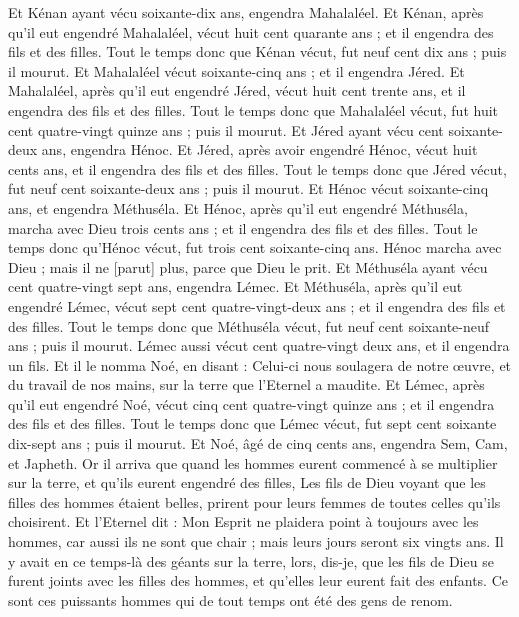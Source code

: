 \begin{multicols}{2}
Et Kénan ayant vécu soixante-dix ans, engendra Mahalaléel.
Et Kénan, après qu'il eut engendré Mahalaléel, vécut huit cent quarante ans ; et il engendra des fils et des filles.
Tout le temps donc que Kénan vécut, fut neuf cent dix ans ; puis il mourut.
Et Mahalaléel vécut soixante-cinq ans ; et il engendra Jéred.
Et Mahalaléel, après qu'il eut engendré Jéred, vécut huit cent trente ans, et il engendra des fils et des filles.
Tout le temps donc que Mahalaléel vécut, fut huit cent quatre-vingt quinze ans ; puis il mourut.
Et Jéred ayant vécu cent soixante-deux ans, engendra Hénoc.
Et Jéred, après avoir engendré Hénoc, vécut huit cents ans, et il engendra des fils et des filles.
Tout le temps donc que Jéred vécut, fut neuf cent soixante-deux ans ; puis il mourut.
Et Hénoc vécut soixante-cinq ans, et engendra Méthuséla.
Et Hénoc, après qu'il eut engendré Méthuséla, marcha avec Dieu trois cents ans ; et il engendra des fils et des filles.
Tout le temps donc qu'Hénoc vécut, fut trois cent soixante-cinq ans.
Hénoc marcha avec Dieu ; mais il ne [parut] plus, parce que Dieu le prit.
Et Méthuséla ayant vécu cent quatre-vingt sept ans, engendra Lémec.
Et Méthuséla, après qu'il eut engendré Lémec, vécut sept cent quatre-vingt-deux ans ; et il engendra des fils et des filles.
Tout le temps donc que Méthuséla vécut, fut neuf cent soixante-neuf ans ; puis il mourut.
Lémec aussi vécut cent quatre-vingt deux ans, et il engendra un fils.
Et il le nomma Noé, en disant : Celui-ci nous soulagera de notre œuvre, et du travail de nos mains, sur la terre que l'Eternel a maudite.
Et Lémec, après qu'il eut engendré Noé, vécut cinq cent quatre-vingt quinze ans ; et il engendra des fils et des filles.
Tout le temps donc que Lémec vécut, fut sept cent soixante dix-sept ans ; puis il mourut.
Et Noé, âgé de cinq cents ans, engendra Sem, Cam, et Japheth.
\VerseOne{}Or il arriva que quand les hommes eurent commencé à se multiplier sur la terre, et qu'ils eurent engendré des filles,
Les fils de Dieu voyant que les filles des hommes étaient belles, prirent pour leurs femmes de toutes celles qu'ils choisirent.
Et l'Eternel dit : Mon Esprit ne plaidera point à toujours avec les hommes, car aussi ils ne sont que chair ; mais leurs jours seront six vingts ans.
Il y avait en ce temps-là des géants sur la terre, lors, dis-je, que les fils de Dieu se furent joints avec les filles des hommes, et qu'elles leur eurent fait des enfants. Ce sont ces puissants hommes qui de tout temps ont été des gens de renom.

\end{multicols}
